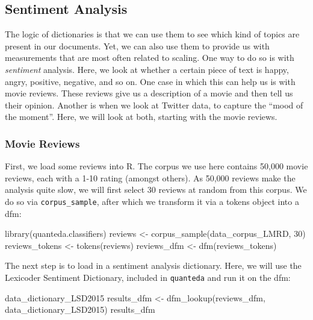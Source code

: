 \documentclass[
]{article}
\newenvironment{Shaded}{\begin{snugshade}}{\end{snugshade}}
\newcommand{\DecValTok}[1]{\textcolor[rgb]{0.00,0.00,0.81}{#1}}
\newcommand{\FunctionTok}[1]{\textcolor[rgb]{0.00,0.00,0.00}{#1}}
\newcommand{\NormalTok}[1]{#1}
\newcommand{\OtherTok}[1]{\textcolor[rgb]{0.56,0.35,0.01}{#1}}
\begin{document}
\hypertarget{sentiment-analysis}{%
\subsection{Sentiment Analysis}\label{sentiment-analysis}}

The logic of dictionaries is that we can use them to see which kind of topics are present in our documents. Yet, we can also use them to provide us with measurements that are most often related to scaling. One way to do so is with \emph{sentiment} analysis. Here, we look at whether a certain piece of text is happy, angry, positive, negative, and so on. One case in which this can help us is with movie reviews. These reviews give us a description of a movie and then tell us their opinion. Another is when we look at Twitter data, to capture the ``mood of the moment''. Here, we will look at both, starting with the movie reviews.

\hypertarget{movie-reviews}{%
\subsubsection{Movie Reviews}\label{movie-reviews}}

First, we load some reviews into R. The corpus we use here contains 50,000 movie reviews, each with a 1-10 rating (amongst others). As 50,000 reviews make the analysis quite slow, we will first select 30 reviews at random from this corpus. We do so via \texttt{corpus\_sample}, after which we transform it via a tokens object into a dfm:

\begin{Shaded}
\begin{Highlighting}[]
\FunctionTok{library}\NormalTok{(quanteda.classifiers)}
\NormalTok{reviews }\OtherTok{\textless{}{-}} \FunctionTok{corpus\_sample}\NormalTok{(data\_corpus\_LMRD, }\DecValTok{30}\NormalTok{)}
\NormalTok{reviews\_tokens }\OtherTok{\textless{}{-}} \FunctionTok{tokens}\NormalTok{(reviews)}
\NormalTok{reviews\_dfm }\OtherTok{\textless{}{-}} \FunctionTok{dfm}\NormalTok{(reviews\_tokens)}
\end{Highlighting}
\end{Shaded}

The next step is to load in a sentiment analysis dictionary. Here, we will use the Lexicoder Sentiment Dictionary, included in \texttt{quanteda} and run it on the dfm:

\begin{Shaded}
\begin{Highlighting}[]
\NormalTok{data\_dictionary\_LSD2015}
\NormalTok{results\_dfm }\OtherTok{\textless{}{-}} \FunctionTok{dfm\_lookup}\NormalTok{(reviews\_dfm, data\_dictionary\_LSD2015)}
\NormalTok{results\_dfm}
\end{Highlighting}
\end{Shaded}
\end{document}
